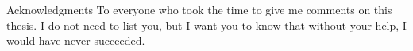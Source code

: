 \begin{abstractpage}{Acknowledgments}
    To everyone who took the time to give me comments on this thesis.
    I do not need to list you, but I want you to know that without your help, I would have never succeeded.


\end{abstractpage}
